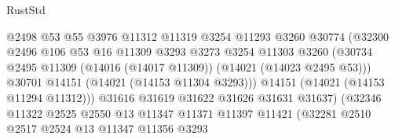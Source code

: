 \begin{lexlean}{RustStd}
\begin{coremodule}
                                        @2498
                                        @53
                                        @55
                                        @3976
                                        @11312
                                        @11319
                                        @3254
                                        @11293
                                        @3260
                                        @30774
                                        (@32300
                                          @2496
                                          @106
                                          @53
                                          @16
                                          @11309
                                          @3293
                                          @3273
                                          @3254
                                          @11303
                                          @3260
                                          (@30734
                                            @2495
                                            @11309
                                            (@14016 (@14017 @11309))
                                            (@14021 (@14023 @2495 @53)))
                                          @30701
                                          @14151
                                          (@14021 (@14153 @11304 @3293)))
                                        @14151
                                        (@14021 (@14153 @11294 @11312)))
                                      @31616
                                      @31619
                                      @31622
                                      @31626
                                      @31631
                                      @31637)
                                    (@32346
                                      @11322
                                      @2525
                                      @2550
                                      @13
                                      @11347
                                      @11371
                                      @11397
                                      @11421
                                      (@32281
                                        @2510
                                        @2517
                                        @2524
                                        @13
                                        @11347
                                        @11356
                                        @3293

\end{coremodule}
\end{lexlean}
